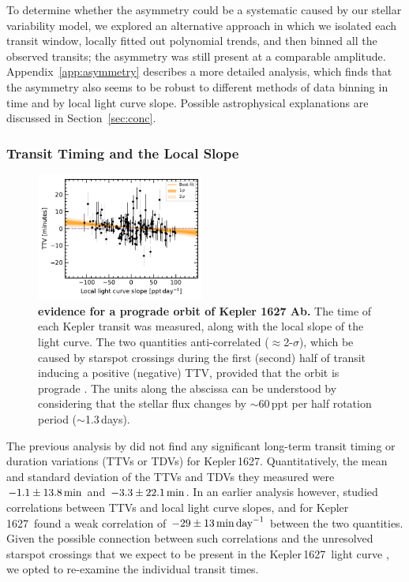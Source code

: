 \documentclass[12pt,modern,twocolumn,tighten,linenumbers]{aastex63}
\newcommand{\sn}{Kepler\,1627} %
\begin{document}
To determine whether the asymmetry could be a systematic caused by our
stellar variability model, we explored an alternative approach in
which we isolated each transit window, locally fitted out
polynomial trends, and then binned all the observed transits; the
asymmetry was still present at a comparable amplitude.
Appendix~\ref{app:asymmetry} describes a more detailed analysis, which finds
that the asymmetry also seems to be robust to different methods of
data binning in time and by local light curve slope.  Possible
astrophysical explanations are discussed in Section~\ref{sec:conc}.

\subsubsection{Transit Timing and the Local Slope}
\label{subsec:ttvslope}

\begin{figure}[tp]
	\begin{center}
		\leavevmode
		\includegraphics[width=0.49\textwidth]{f6.pdf}
	\end{center}
	\vspace{-0.6cm}
	\caption{
    {\bf {} evidence for a prograde orbit of Kepler 1627 Ab.} The time of
    each Kepler transit was measured, along with the local slope of
    the light curve.  The two quantities  anti-correlated
    ($\approx$2-$\sigma$), which
     be caused by starspot crossings during the first
    (second) half of transit inducing a positive (negative) TTV,
    provided that the orbit is prograde \citep{mazeh_time_2015}.  The
    units along the abscissa can be understood by considering that the
    stellar flux changes by $\sim$60\,ppt per half rotation period
    ($\sim$1.3\,days).
		\label{fig:corr}
	}
\end{figure}


The previous analysis by \citet{holczer_transit_2016} did not
find any significant long-term transit timing or duration variations
(TTVs or TDVs) for \sn.  Quantitatively, the mean and standard deviation of the
TTVs and TDVs they measured were $-1.1\pm13.8\,{\rm
min}$ and $-3.3\pm22.1\,{\rm min}$.  In an
earlier analysis however, \citet{holczer_time_2015} studied correlations
between TTVs and local light curve slopes, and for \sn\
found a weak correlation of $-29\pm13\,{\rm min}\,{\rm day}^{-1}$
between the two quantities.  Given the possible connection between such
correlations and the unresolved starspot crossings that we expect to
be present in the \sn\ light curve \citep{mazeh_time_2015}, we opted to re-examine the
individual transit times.
\end{document}
